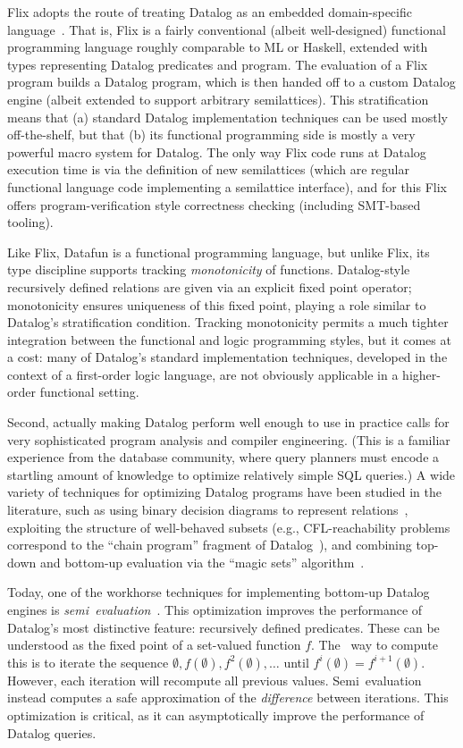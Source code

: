 Flix adopts the route of treating Datalog as an embedded
domain-specific language~\cite{edsl}. That is, Flix is a fairly
conventional (albeit well-designed) functional programming language
roughly comparable to ML or Haskell, extended with types representing
Datalog predicates and program. The evaluation of a Flix program
builds a Datalog program, which is then handed off to a custom Datalog
engine (albeit extended to support arbitrary semilattices).  This
stratification means that (a) standard Datalog implementation
techniques can be used mostly off-the-shelf, but that (b) its
functional programming side is mostly a very powerful macro system for
Datalog.  The only way Flix code runs at Datalog execution time is via
the definition of new semilattices (which are regular functional
language code implementing a semilattice interface), and for this Flix
offers program-verification style correctness checking (including
SMT-based tooling).

Like Flix, Datafun is a functional programming language, but unlike
Flix, its type discipline supports tracking \emph{monotonicity} of
functions. Datalog-style recursively defined relations are given via
an explicit fixed point operator; monotonicity ensures uniqueness of
this fixed point, playing a role similar to Datalog's stratification
condition.
%
Tracking monotonicity permits a much tighter integration between the
functional and logic programming styles, but it comes at a cost: many
of Datalog's standard implementation techniques, developed in the
context of a first-order logic language, are not obviously applicable
in a higher-order functional setting.

Second, actually making Datalog perform well enough to use in practice
calls for very sophisticated program analysis and compiler
engineering. (This is a familiar experience from the database
community, where query planners must encode a startling amount of
knowledge to optimize relatively simple SQL queries.) A wide variety
of techniques for optimizing Datalog programs have been studied in the
literature, such as using binary decision diagrams to represent
relations~\cite{whaley-phd}, exploiting the structure of well-behaved
subsets (e.g., CFL-reachability problems correspond to the ``chain
program'' fragment of Datalog~\cite{chain-programs}), and combining
top-down and bottom-up evaluation via the ``magic sets''
algorithm~\cite{magic-sets}.

Today, one of the workhorse techniques for implementing bottom-up
Datalog engines is \emph{semi\naive\ evaluation}~\cite{seminaive}.
This optimization improves the performance of Datalog's most
distinctive feature: recursively defined predicates. These can be
understood as the fixed point of a set-valued function $f$. The
\naive\ way to compute this is to iterate the sequence $\emptyset,
f(\emptyset), f^2(\emptyset), \dots$ until $f^i(\emptyset) =
f^{i+1}(\emptyset)$. However, each iteration will recompute all
previous values. Semi\naive\ evaluation instead computes a safe
approximation of the \emph{difference} between iterations. This
optimization is critical, as it can asymptotically improve the
performance of Datalog queries.

